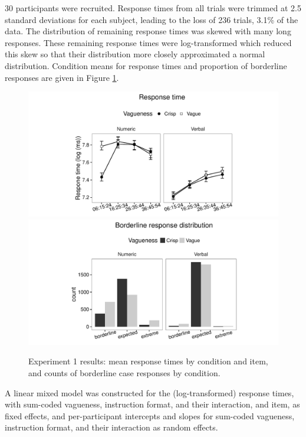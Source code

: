30 participants were recruited. Response times from all trials were trimmed at 2.5 standard deviations for each subject, leading to the loss of 236 trials, 3.1\% of the data. The distribution of remaining response times was skewed with many long responses. These remaining response times were log-transformed which reduced this skew so that their distribution more closely approximated a normal distribution. Condition means for response times and proportion of borderline responses are given in Figure \ref{resultsC-exp-1}. 

\begin{figure}[htbp]
\centering
\includegraphics[trim = 20mm 0mm 30mm 0mm, clip, width=.49\textwidth]{figures/Ce1-rtplot-1.pdf}
\includegraphics[trim = 20mm 0mm 25mm 0mm, clip, width=.49\textwidth]{figures/Ce1-blBarChart-1}
\caption{Experiment 1 results: mean response times by condition and item, and counts of borderline case responses by condition.}
\label{resultsC-exp-1}
\end{figure}

A linear mixed model was constructed for the (log-transformed) response times, with sum-coded vagueness, instruction format, and their interaction, and item, as fixed effects, and per-participant intercepts and slopes for sum-coded vagueness, instruction format, and their interaction as random effects. 

